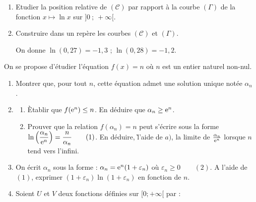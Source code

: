 \begin{description}
\begin{enumerate}
\begin{enumerate}
                                          \item Etudier la position relative de $(\mathscr{C})$ par rapport \`a la courbe 
                                                $(\Gamma)$ de la fonction $x\mapsto \ln x$ sur $]0 \ ; \ +\infty[$.
                                          \item Construire dans un rep\`ere les courbes $(\mathscr{C})$ et $(\Gamma)$. \par
                                          On donne $\ln (0,27) = -1,3$ ; $\ln (0,28) = -1,2$.
                                    \end{enumerate}
                        \end{enumerate}
                  \item[II-] On se propose d'\'etudier l'\'equation $f(x) = n$
                        o\`u $n$ est un entier naturel non-nul.
                        \begin{enumerate}
                              \item Montrer que, pour tout $n$, cette \'equation admet une solution unique not\'ee $\alpha_n$.
                              \item \begin{enumerate}
                                          \item \`Etablir que $f(\mathrm{e}^{n}) \leq n$. En d\'eduire que $\alpha_n \geq \mathrm{e}^{n}$.
                                          \item Prouver que la relation $f(\alpha_n) = n$ peut s'\'ecrire sous la forme 
                                                $\displaystyle{\ln \left( \frac{\alpha_n}{\mathrm{e}^{n}} \right) 
                                                      = \frac{n}{\alpha_n}} \qquad(1)$. \newline
                                                En d\'eduire, \` l'aide de $a)$, la limite de 
                                                $\frac{\alpha_n}{\mathrm{e}^{n}}$ lorsque $n$ tend vers l'infini.
                                    \end{enumerate}
                              \item On \'ecrit $\alpha_n$ sous la forme : 
                                    $\alpha_n = \mathrm{e}^{n} (1+\varepsilon_n)$ o\`u $\varepsilon_n \geq 0 \qquad (2)$.
                                    A l'aide de $(1)$, exprimer $(1+\varepsilon_n) \ln (1+\varepsilon_n)$ en fonction de $n$.
                              \item Soient $U$ et $V$ deux fonctions d\'efinies sur $[0 ; +\infty[$ par :

\end{enumerate}
\end{description}
